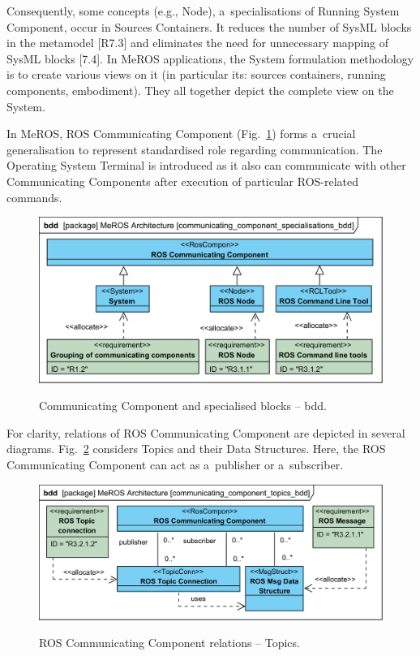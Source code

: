 \documentclass[11pt,oneside,a4paper]{report}
\begin{document}
	Consequently, some concepts (e.g., Node), a~specialisations of Running System Component, occur in Sources Containers. It reduces the number of SysML blocks in the metamodel [R7.3] and eliminates the need for unnecessary mapping of SysML blocks [7.4]. In MeROS applications, the System formulation methodology is to create various views on it (in particular its: sources containers, running components, embodiment). They all together depict the complete view on the System.
	
	In MeROS, ROS Communicating Component (Fig.~\ref{fig:communicating_components_bdd}) forms a~crucial generalisation to represent standardised role regarding communication. The Operating System Terminal is introduced as it also can communicate with other Communicating Components after execution of particular ROS-related commands.
	
		
	\begin{figure}[H]
		\centering
		\begin{center}
			{\includegraphics[scale=1.0]{diagrams/communicating_component_specialisations_bdd.png}}
		\end{center}
		\caption{Communicating Component and specialised blocks -- bdd.} 
		\label{fig:communicating_components_bdd}
	\end{figure}
	
	For clarity, relations of ROS Communicating Component are depicted in several diagrams. Fig.~\ref{fig:communicating_component_topics_bdd} considers Topics and their Data Structures. Here, the ROS Communicating Component can act as a~publisher or a~subscriber.	
	 
	
	\begin{figure}[H]
		\centering
		\begin{center}
			{\includegraphics[scale=1.0]{diagrams/communicating_component_topics_bdd.png}}
		\end{center}
		\caption{ROS Communicating Component relations -- Topics.} 
		\label{fig:communicating_component_topics_bdd}
	\end{figure}
	
\end{document}
